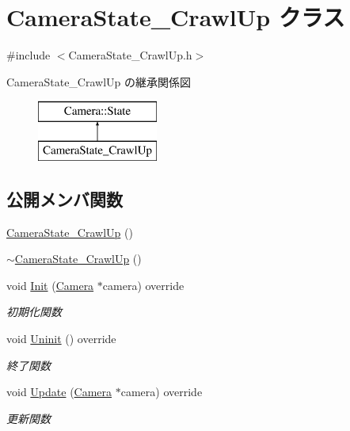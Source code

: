 \hypertarget{class_camera_state___crawl_up}{}\section{Camera\+State\+\_\+\+Crawl\+Up クラス}
\label{class_camera_state___crawl_up}


{\ttfamily \#include $<$Camera\+State\+\_\+\+Crawl\+Up.\+h$>$}

Camera\+State\+\_\+\+Crawl\+Up の継承関係図\begin{figure}[H]
\begin{center}
\leavevmode
\includegraphics[height=2.000000cm]{class_camera_state___crawl_up}
\end{center}
\end{figure}
\subsection*{公開メンバ関数}
\begin{DoxyCompactItemize}
\item 
\mbox{\hyperlink{class_camera_state___crawl_up_a75741967576f6f544007ad8ccc574202}{Camera\+State\+\_\+\+Crawl\+Up}} ()
\item 
\mbox{\hyperlink{class_camera_state___crawl_up_a9b7f2e6cc8be5c356967d8df8c20e93a}{$\sim$\+Camera\+State\+\_\+\+Crawl\+Up}} ()
\item 
void \mbox{\hyperlink{class_camera_state___crawl_up_a43a47eb4e7445c6801e8316c5a635709}{Init}} (\mbox{\hyperlink{class_camera}{Camera}} $\ast$camera) override
\begin{DoxyCompactList}\small\item\em 初期化関数 \end{DoxyCompactList}\item 
void \mbox{\hyperlink{class_camera_state___crawl_up_a046ec18a91e31b210ae000133fa6113a}{Uninit}} () override
\begin{DoxyCompactList}\small\item\em 終了関数 \end{DoxyCompactList}\item 
void \mbox{\hyperlink{class_camera_state___crawl_up_aaebd2634f1677b7c00e6761ed91e1264}{Update}} (\mbox{\hyperlink{class_camera}{Camera}} $\ast$camera) override
\begin{DoxyCompactList}\small\item\em 更新関数 \end{DoxyCompactList}\end{DoxyCompactItemize}


